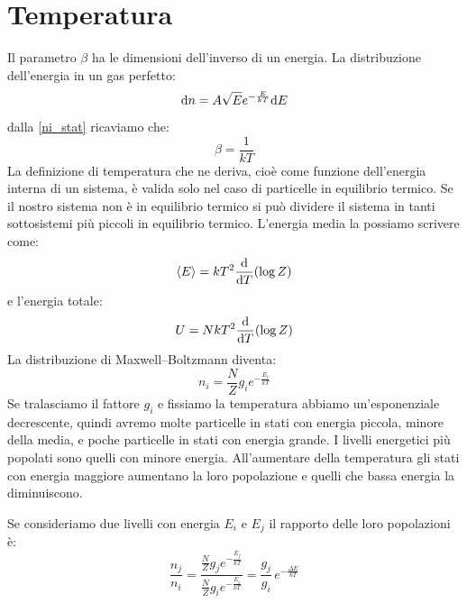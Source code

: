 \section{Temperatura}
Il parametro $\beta$ ha le dimensioni dell'inverso di un energia. La distribuzione dell'energia in un gas perfetto:
\begin{equation}
	\mathrm{d} n=A\sqrt{E}e^{-\frac{E}{kT}}\mathrm{d} E
\end{equation}
dalla \eqref{ni_stat} ricaviamo che:
\begin{equation}
	\beta=\frac{1}{kT}
\end{equation}
La definizione di temperatura che ne deriva, cioè come funzione dell'energia interna di un sistema, è valida solo nel caso di particelle in equilibrio termico. Se il nostro sistema non è in equilibrio termico si può dividere il sistema in tanti sottosistemi più piccoli in equilibrio termico.
L'energia media la possiamo scrivere come:
\begin{equation}
	\left<E\right>=kT^2\frac{\mathrm{d}}{\mathrm{d} T}(\log Z)
\end{equation}
e l'energia totale:
\begin{equation}
	U=NkT^2\frac{\mathrm{d}}{\mathrm{d} T}(\log Z)
\end{equation}
La distribuzione di Maxwell--Boltzmann diventa:
\begin{equation}
	n_i=\frac{N}{Z}g_ie^{-\frac{E_i}{kT}}
\end{equation}
Se tralasciamo il fattore $g_i$ e fissiamo la temperatura abbiamo un'esponenziale decrescente, quindi avremo molte particelle in stati con energia piccola, minore della media, e poche particelle in stati con energia grande. I livelli energetici più popolati sono quelli con minore energia. All'aumentare della temperatura gli stati con energia maggiore aumentano la loro popolazione e quelli che bassa energia la diminuiscono.

Se consideriamo due livelli con energia $E_i$ e $E_j$ il rapporto delle loro popolazioni è:
\begin{equation}
	\frac{n_j}{n_i}=\frac{\frac{N}{Z}g_je^{-\frac{E_j}{kT}}}{\frac{N}{Z}g_ie^{-\frac{E_i}{kT}}}=\frac{g_j}{g_i}\,e^{-\frac{\Delta E}{kT}}
\end{equation}
